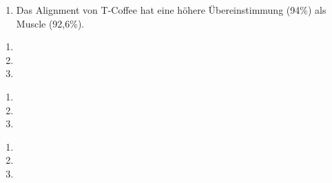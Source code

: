 \documentclass{homework}
\begin{document}
\begin{enumerate}
\begin{enumerate}
\item
Das Alignment von T-Coffee hat eine höhere Übereinstimmung (94\%) als Muscle (92,6\%).
\end{enumerate}

\begin{enumerate}
\item 
	
\item
	
\item
	
\end{enumerate}


\begin{enumerate}
\item 

\item 

\item 

\end{enumerate}


\begin{enumerate}
\item
	
\item

\item

\end{enumerate}

\end{enumerate}
\end{document}
